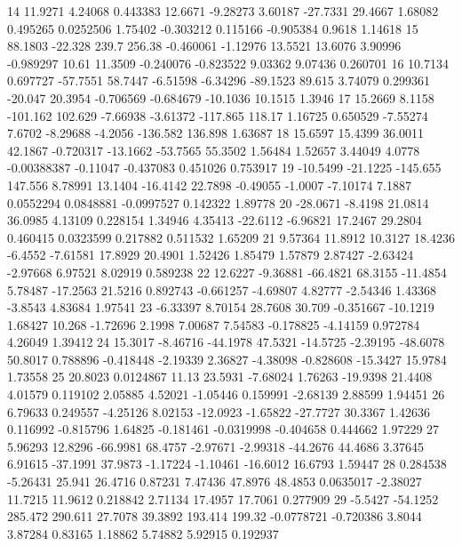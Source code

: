 14  11.9271  4.24068  0.443383  12.6671  -9.28273  3.60187  -27.7331  29.4667  1.68082  0.495265  0.0252506  1.75402  -0.303212  0.115166  -0.905384  0.9618  1.14618
15  88.1803  -22.328  239.7  256.38  -0.460061  -1.12976  13.5521  13.6076  3.90996  -0.989297  10.61  11.3509  -0.240076  -0.823522  9.03362  9.07436  0.260701
16  10.7134  0.697727  -57.7551  58.7447  -6.51598  -6.34296  -89.1523  89.615  3.74079  0.299361  -20.047  20.3954  -0.706569  -0.684679  -10.1036  10.1515  1.3946
17  15.2669  8.1158  -101.162  102.629  -7.66938  -3.61372  -117.865  118.17  1.16725  0.650529  -7.55274  7.6702  -8.29688  -4.2056  -136.582  136.898  1.63687
18  15.6597  15.4399  36.0011  42.1867  -0.720317  -13.1662  -53.7565  55.3502  1.56484  1.52657  3.44049  4.0778  -0.00388387  -0.11047  -0.437083  0.451026  0.753917
19  -10.5499  -21.1225  -145.655  147.556  8.78991  13.1404  -16.4142  22.7898  -0.49055  -1.0007  -7.10174  7.1887  0.0552294  0.0848881  -0.0997527  0.142322  1.89778
20  -28.0671  -8.4198  21.0814  36.0985  4.13109  0.228154  1.34946  4.35413  -22.6112  -6.96821  17.2467  29.2804  0.460415  0.0323599  0.217882  0.511532  1.65209
21  9.57364  11.8912  10.3127  18.4236  -6.4552  -7.61581  17.8929  20.4901  1.52426  1.85479  1.57879  2.87427  -2.63424  -2.97668  6.97521  8.02919  0.589238
22  12.6227  -9.36881  -66.4821  68.3155  -11.4854  5.78487  -17.2563  21.5216  0.892743  -0.661257  -4.69807  4.82777  -2.54346  1.43368  -3.8543  4.83684  1.97541
23  -6.33397  8.70154  28.7608  30.709  -0.351667  -10.1219  1.68427  10.268  -1.72696  2.1998  7.00687  7.54583  -0.178825  -4.14159  0.972784  4.26049  1.39412
24  15.3017  -8.46716  -44.1978  47.5321  -14.5725  -2.39195  -48.6078  50.8017  0.788896  -0.418448  -2.19339  2.36827  -4.38098  -0.828608  -15.3427  15.9784  1.73558
25  20.8023  0.0124867  11.13  23.5931  -7.68024  1.76263  -19.9398  21.4408  4.01579  0.119102  2.05885  4.52021  -1.05446  0.159991  -2.68139  2.88599  1.94451
26  6.79633  0.249557  -4.25126  8.02153  -12.0923  -1.65822  -27.7727  30.3367  1.42636  0.116992  -0.815796  1.64825  -0.181461  -0.0319998  -0.404658  0.444662  1.97229
27  5.96293  12.8296  -66.9981  68.4757  -2.97671  -2.99318  -44.2676  44.4686  3.37645  6.91615  -37.1991  37.9873  -1.17224  -1.10461  -16.6012  16.6793  1.59447
28  0.284538  -5.26431  25.941  26.4716  0.87231  7.47436  47.8976  48.4853  0.0635017  -2.38027  11.7215  11.9612  0.218842  2.71134  17.4957  17.7061  0.277909
29  -5.5427  -54.1252  285.472  290.611  27.7078  39.3892  193.414  199.32  -0.0778721  -0.720386  3.8044  3.87284  0.83165  1.18862  5.74882  5.92915  0.192937
